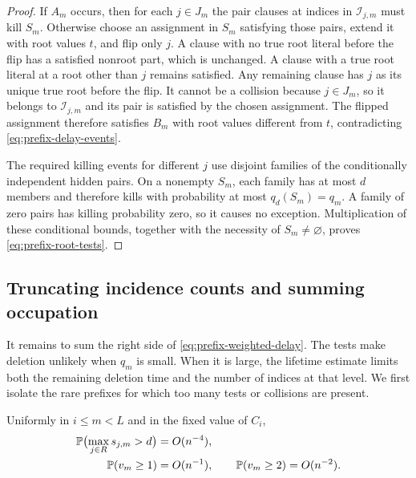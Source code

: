 \begin{proof}
If \(A_m\) occurs, then for each \(j\in J_m\) the pair clauses at
indices in \(\mathcal I_{j,m}\) must kill \(S_m\).  Otherwise choose
an assignment in \(S_m\) satisfying those pairs, extend it with root
values \(t\), and flip only \(j\).  A clause with no true root literal
before the flip has a satisfied nonroot part, which is unchanged.  A
clause with a true root literal at a root other than \(j\) remains
satisfied.  Any remaining clause has \(j\) as its unique true root
before the flip.  It cannot be a collision because \(j\in J_m\), so
it belongs to \(\mathcal I_{j,m}\) and its pair is satisfied by the
chosen assignment.  The flipped assignment therefore satisfies
\(B_m\) with root values different from \(t\), contradicting
\eqref{eq:prefix-delay-events}.

The required killing events for different \(j\) use disjoint families
of the conditionally independent hidden pairs.  On a nonempty \(S_m\),
each family has at most \(d\) members and therefore kills with
probability at most \(q_d(S_m)=q_m\).  A family of zero pairs has
killing probability zero, so it causes no exception.  Multiplication of
these conditional bounds, together with the necessity of
\(S_m\ne\varnothing\), proves \eqref{eq:prefix-root-tests}.
\end{proof}

\subsection{Truncating incidence counts and summing occupation}

It remains to sum the right side of \eqref{eq:prefix-weighted-delay}.
The tests make deletion unlikely when \(q_m\) is small.  When it is
large, the lifetime estimate limits both the remaining deletion time
and the number of indices at that level.  We first isolate the rare
prefixes for which too many tests or collisions are present.

\begin{lemma}\label{lem:prefix-counts}
Uniformly in \(i\le m<L\) and in the fixed value of \(C_i\),
\begin{align}
 \mathbb P\bigl(\max_{j\in R}s_{j,m}>d\bigr)&=O(n^{-4}),
 \label{eq:prefix-large-count}\\
 \mathbb P(v_m\ge1)&=O(n^{-1}),\qquad
 \mathbb P(v_m\ge2)=O(n^{-2}).
 \label{eq:prefix-collision-counts}
\end{align}
\end{lemma}

